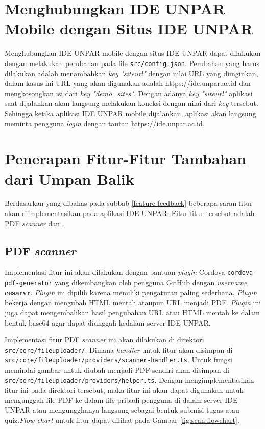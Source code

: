 \section{Menghubungkan IDE UNPAR Mobile dengan Situs IDE UNPAR}
\label{mobile:connect}
Menghubungkan IDE UNPAR mobile dengan situs IDE UNPAR dapat dilakukan dengan melakukan perubahan pada file \texttt{src/config.json}.  Perubahan yang harus dilakukan adalah menambahkan \textit{key} \textit{"siteurl"} dengan nilai URL yang diinginkan, dalam kasus ini URL yang akan digunakan adalah \url{https://ide.unpar.ac.id} dan mengkosongkan isi dari \textit{key "demo\_sites"}. Dengan adanya \textit{key "siteurl"} aplikasi saat dijalankan akan langsung melakukan koneksi dengan nilai dari \textit{key} tersebut. Sehingga ketika aplikasi IDE UNPAR mobile dijalankan, aplikasi akan langsung meminta pengguna \textit{login} dengan tautan \url{https://ide.unpar.ac.id}. 

\section{Penerapan Fitur-Fitur Tambahan dari Umpan Balik}
\label{feat:feedback}

Berdasarkan yang dibahas pada subbab \ref{feature feedback} beberapa saran fitur akan diimplementasikan pada aplikasi IDE UNPAR. Fitur-fitur tersebut adalah PDF \textit{scanner} dan .

\subsection{PDF \textit{scanner}}
\label{feat:pdfscan}
Implementasi fitur ini akan dilakukan dengan bantuan \textit{plugin} Cordova \texttt{cordova-pdf-generator} yang dikembangkan oleh pengguna GitHub dengan \textit{username} \textbf{cesarvr}. \textit{Plugin} ini dipilih karena memiliki pengaturan paling sederhana. \textit{Plugin} bekerja dengan mengubah HTML mentah ataupun URL menjadi PDF. \textit{Plugin} ini juga dapat mengembalikan hasil pengubahan URL atau HTML mentah ke dalam bentuk base64 agar dapat diunggah kedalam server IDE UNPAR. 

Implementasi fitur PDF \textit{scanner} ini akan dilakukan di direktori \texttt{src/core/fileuploader/}. Dimana \textit{handler} untuk fitur akan disimpan di \texttt{src/core/fileuploader/providers/scanner-handler.ts}. Untuk fungsi memindai gambar untuk diubah menjadi PDF sendiri akan disimpan di \\ \texttt{src/core/fileuploader/providers/helper.ts}. Dengan mengimplementasikan fitur ini pada direktori tersebut, maka fitur ini akan dapat digunakan untuk mengunggah file PDF ke dalam file pribadi pengguna di dalam server IDE UNPAR atau mengungghanya langsung sebagai bentuk submisi tugas atau quiz.\textit{Flow chart} untuk fitur dapat dilihat pada Gambar \ref{fig:scan:flowchart}. 

